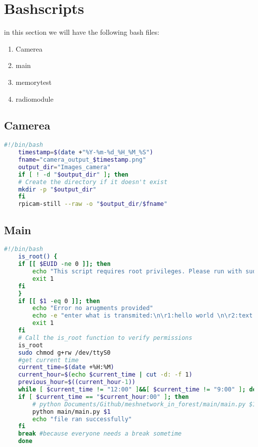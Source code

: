 \section{Bashscripts}
in this section we  will have  the following bash files:
\begin{enumerate}
    \item Camerea
    \item main
    \item memorytest
    \item radiomodule
\end{enumerate}
\subsection{Camerea}
\begin{lstlisting}[language=bash,caption={Code for triggering the camerea}]
    #!/bin/bash
    timestamp=$(date +"%Y-%m-%d_%H_%M_%S")
    fname="camera_output_$timestamp.png"
    output_dir="Images_camera"
    if [ ! -d "$output_dir" ]; then
    # Create the directory if it doesn't exist
    mkdir -p "$output_dir"
    fi
    rpicam-still --raw -o "$output_dir/$fname"
\end{lstlisting}
\newpage
\subsection{Main}
\begin{lstlisting}[language=bash,caption={Code for runing the main function}]
    #!/bin/bash
    is_root() {
    if [[ $EUID -ne 0 ]]; then
        echo "This script requires root privileges. Please run with sudo."
        exit 1
    fi
    }
    if [[ $1 -eq 0 ]]; then
        echo "Error no arugments provided"
        echo -e "enter what is transmited:\n\r1:hello world \n\r2:text file \n\r3:csv file\n\r4:PNG\n\r"
        exit 1
    fi
    # Call the is_root function to verify permissions
    is_root
    sudo chmod g+rw /dev/ttyS0
    #get current time
    current_time=$(date +%H:%M)
    current_hour=$(echo $current_time | cut -d: -f 1)
    previous_hour=$((current_hour-1))
    while [ $current_time != "12:00" ]&&[ $current_time != "9:00" ]; do
    if [ $current_time == "$current_hour:00" ]; then
        # python Documents/Github/meshnetwork_in_forest/main/main.py $1
        python main/main.py $1
        echo "file ran successfully"
    fi
    break #because everyone needs a break sometime 
    done
\end{lstlisting}
\newpage
